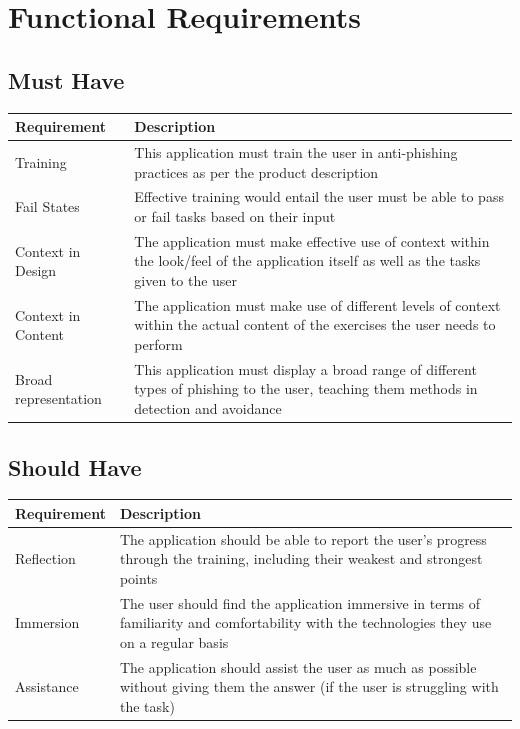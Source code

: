 \documentclass{l4proj}
\begin{document}
\section{Functional Requirements}
\subsection{Must Have}
\begin{tabular}{ | m{10em} | m{30em}| } 
  \hline
  \textbf{Requirement} & \textbf{Description} \\ 
  \hline
  Training & This application must train the user in anti-phishing practices as per the product description \\ 
  \hline
  Fail States & Effective training would entail the user must be able to pass or fail tasks based on their input \\ 
  \hline
  Context in Design & The application must make effective use of context within the look/feel of the application itself as well as the tasks given to the user \\  
  \hline
  Context in Content & The application must make use of different levels of context within the actual content of the exercises the user needs to perform \\  
  \hline
  Broad representation & This application must display a broad range of different types of phishing to the user, teaching them methods in detection and avoidance \\  
  \hline
\end{tabular}

\subsection{Should Have}
\begin{tabular}{ | m{10em} | m{30em}| } 
  \hline
  \textbf{Requirement} & \textbf{Description} \\ 
  \hline
  Reflection & The application should be able to report the user’s progress through the training, including their weakest and strongest points \\ 
  \hline
  Immersion & The user should find the application immersive in terms of familiarity and comfortability with the technologies they use on a regular basis \\ 
  \hline
  Assistance & The application should assist the user as much as possible without giving them the answer (if the user is struggling with the task) \\ 
  \hline
\end{tabular}
\end{document}
